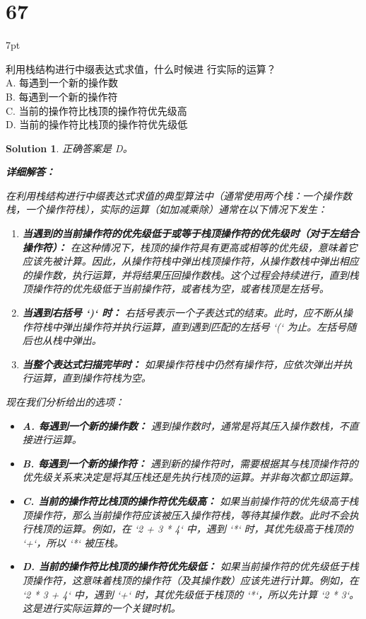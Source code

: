 \documentclass[UTF8]{report}
\newtheorem{solution}{Solution}
\theoremstyle{MyLineTheoremStyle} %
\theoremstyle{MyBlockTheoremStyle} %
\theoremstyle{MySubsubsectionStyle} %
\newenvironment{graybox}{%
        \def\FrameCommand{%
        \hspace{1pt}%
        {\color{gray}\small \vrule width 2pt}%
        {\color{graybox_color}\vrule width 4pt}%
        \colorbox{graybox_color}%
        }%
        \MakeFramed{\advance\hsize-\width\FrameRestore}%
        \noindent\hspace{-4.55pt}%
        \begin{adjustwidth}{}{7pt}%
        \vspace{2pt}\vspace{2pt}%
        }
        {%
        \vspace{2pt}\end{adjustwidth}\endMakeFramed%
        }
\begin{document}
\section*{67}
\begin{graybox}
利用栈结构进行中缀表达式求值，什么时候进
行实际的运算？\\
A. 每遇到一个新的操作数 \\
B. 每遇到一个新的操作符 \\
C. 当前的操作符比栈顶的操作符优先级高 \\
D. 当前的操作符比栈顶的操作符优先级低
\end{graybox}

\begin{solution}
正确答案是 D。

\textbf{详细解答：}

在利用栈结构进行中缀表达式求值的典型算法中（通常使用两个栈：一个操作数栈，一个操作符栈），实际的运算（如加减乘除）通常在以下情况下发生：

\begin{enumerate}
    \item \textbf{当遇到的当前操作符的优先级低于或等于栈顶操作符的优先级时（对于左结合操作符）：}
    在这种情况下，栈顶的操作符具有更高或相等的优先级，意味着它应该先被计算。因此，从操作符栈中弹出栈顶操作符，从操作数栈中弹出相应的操作数，执行运算，并将结果压回操作数栈。这个过程会持续进行，直到栈顶操作符的优先级低于当前操作符，或者栈为空，或者栈顶是左括号。

    \item \textbf{当遇到右括号 `)` 时：}
    右括号表示一个子表达式的结束。此时，应不断从操作符栈中弹出操作符并执行运算，直到遇到匹配的左括号 `(` 为止。左括号随后也从栈中弹出。

    \item \textbf{当整个表达式扫描完毕时：}
    如果操作符栈中仍然有操作符，应依次弹出并执行运算，直到操作符栈为空。
\end{enumerate}

现在我们分析给出的选项：
\begin{itemize}
    \item \textbf{A. 每遇到一个新的操作数：} 遇到操作数时，通常是将其压入操作数栈，不直接进行运算。
    \item \textbf{B. 每遇到一个新的操作符：} 遇到新的操作符时，需要根据其与栈顶操作符的优先级关系来决定是将其压栈还是先执行栈顶的运算。并非每次都立即运算。
    \item \textbf{C. 当前的操作符比栈顶的操作符优先级高：} 如果当前操作符的优先级高于栈顶操作符，那么当前操作符应该被压入操作符栈，等待其操作数。此时不会执行栈顶的运算。例如，在 `2 + 3 * 4` 中，遇到 `*` 时，其优先级高于栈顶的 `+`，所以 `*` 被压栈。
    \item \textbf{D. 当前的操作符比栈顶的操作符优先级低：} 如果当前操作符的优先级低于栈顶操作符，这意味着栈顶的操作符（及其操作数）应该先进行计算。例如，在 `2 * 3 + 4` 中，遇到 `+` 时，其优先级低于栈顶的 `*`，所以先计算 `2 * 3`。这是进行实际运算的一个关键时机。
\end{itemize}


\end{solution}
\end{document}
